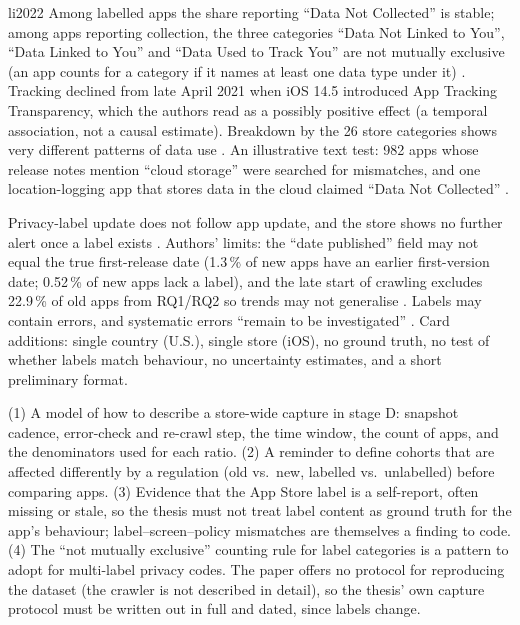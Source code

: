 \begin{papercard}{li2022}
 Among labelled apps the share reporting ``Data Not Collected'' is stable; among apps reporting collection, the three categories ``Data Not Linked to You'', ``Data Linked to You'' and ``Data Used to Track You'' are not mutually exclusive (an app counts for a category if it names at least one data type under it) . Tracking declined from late April 2021 when iOS 14.5 introduced App Tracking Transparency, which the authors read as a possibly positive effect (a temporal association, not a causal estimate). Breakdown by the 26 store categories shows very different patterns of data use . An illustrative text test: 982 apps whose release notes mention ``cloud storage'' were searched for mismatches, and one location-logging app that stores data in the cloud claimed ``Data Not Collected'' .

 Privacy-label update does not follow app update, and the store shows no further alert once a label exists . Authors' limits: the ``date published'' field may not equal the true first-release date (1.3\,\% of new apps have an earlier first-version date; 0.52\,\% of new apps lack a label), and the late start of crawling excludes 22.9\,\% of old apps from RQ1/RQ2 so trends may not generalise . Labels may contain errors, and systematic errors ``remain to be investigated'' . Card additions: single country (U.S.), single store (iOS), no ground truth, no test of whether labels match behaviour, no uncertainty estimates, and a short preliminary format.

 (1) A model of how to describe a store-wide capture in stage D: snapshot cadence, error-check and re-crawl step, the time window, the count of apps, and the denominators used for each ratio. (2) A reminder to define cohorts that are affected differently by a regulation (old vs.\ new, labelled vs.\ unlabelled) before comparing apps. (3) Evidence that the App Store label is a self-report, often missing or stale, so the thesis must not treat label content as ground truth for the app's behaviour; label--screen--policy mismatches are themselves a finding to code. (4) The ``not mutually exclusive'' counting rule for label categories is a pattern to adopt for multi-label privacy codes. The paper offers no protocol for reproducing the dataset (the crawler is not described in detail), so the thesis' own capture protocol must be written out in full and dated, since labels change.
\end{papercard}
